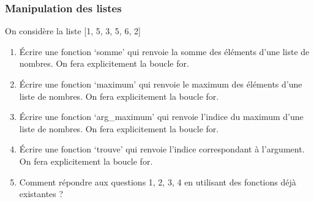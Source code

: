 \documentclass[letterpaper,10pt,english]{sphinxhowto}
\begin{document}
\subsubsection{Manipulation des listes}
\label{\detokenize{cours3_conteneur_corr_exercices:manipulation-des-listes}}
\sphinxAtStartPar
On considère la liste {[}1, 5, 3, 5, 6, 2{]}
\begin{enumerate}
%
\item {} 
\sphinxAtStartPar
Écrire une fonction ‘somme’ qui renvoie la somme des éléments d’une liste de nombres. On fera explicitement la boucle for.

\item {} 
\sphinxAtStartPar
Écrire une fonction ‘maximum’ qui renvoie le maximum des éléments d’une liste de nombres. On fera explicitement la boucle for.

\item {} 
\sphinxAtStartPar
Écrire une fonction ‘arg\_maximum’ qui renvoie l’indice du maximum d’une liste de nombres. On fera explicitement la boucle for.

\item {} 
\sphinxAtStartPar
Écrire une fonction ‘trouve’ qui renvoie l’indice correspondant à l’argument. On fera explicitement la boucle for.

\item {} 
\sphinxAtStartPar
Comment répondre aux questions 1, 2, 3, 4 en utilisant des fonctions déjà existantes ?

\end{enumerate}
\end{document}
